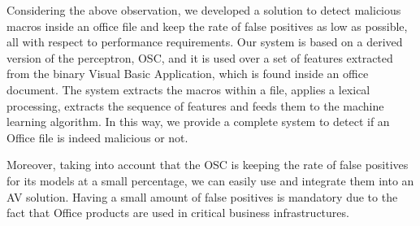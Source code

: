 \par
Considering the above observation, we developed a solution to detect malicious macros inside an office file and keep the rate of false positives as low as possible, all with respect to performance requirements. Our system is based on a derived version of the perceptron, OSC\cite{OSC}, and it is used over a set of features extracted from the binary Visual Basic Application, which is found inside an office document. The system extracts the macros within a file, applies a lexical processing, extracts the sequence of features and feeds them to the machine learning algorithm. In this way, we provide a complete system to detect if an Office file is indeed malicious or not.
\par
Moreover, taking into account that the OSC is keeping the rate of false positives for its models at a small percentage, we can easily use and integrate them into an AV solution. Having a small amount of false positives is mandatory due to the fact that Office products are used in critical business infrastructures.
